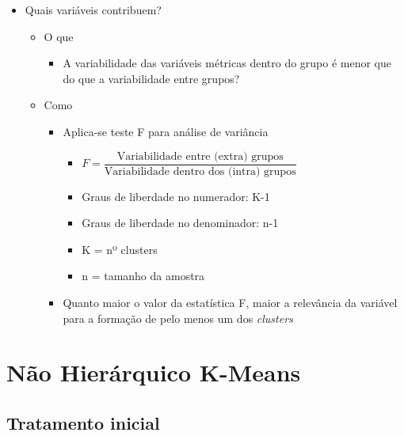 \documentclass[
  letterpaper,
  DIV=11,
  numbers=noendperiod]{scrreprt}
\providecommand{\tightlist}{%
  \setlength{\itemsep}{0pt}\setlength{\parskip}{0pt}}\usepackage{longtable,booktabs,array}
\begin{document}
\begin{itemize}
\tightlist
\item
  Quais variáveis contribuem?

  \begin{itemize}
  \tightlist
  \item
    O que

    \begin{itemize}
    \tightlist
    \item
      A variabilidade das variáveis métricas dentro do grupo é menor que
      do que a variabilidade entre grupos?
    \end{itemize}
  \item
    Como

    \begin{itemize}
    \tightlist
    \item
      Aplica-se teste F para análise de variância

      \begin{itemize}
      \tightlist
      \item
        \(F = \dfrac{\text{Variabilidade entre (extra) grupos}}{\text{Variabilidade dentro dos (intra) grupos}}\)
      \item
        Graus de liberdade no numerador: K-1
      \item
        Graus de liberdade no denominador: n-1
      \item
        K = nº clusters
      \item
        n = tamanho da amostra
      \end{itemize}
    \item
      Quanto maior o valor da estatística F, maior a relevância da
      variável para a formação de pelo menos um dos \emph{clusters}
    \end{itemize}
  \end{itemize}
\end{itemize}

\hypertarget{nuxe3o-hieruxe1rquico-k-means}{%
\section{Não Hierárquico K-Means}\label{nuxe3o-hieruxe1rquico-k-means}}

\hypertarget{tratamento-inicial-1}{%
\subsection{Tratamento inicial}\label{tratamento-inicial-1}}
\end{document}
